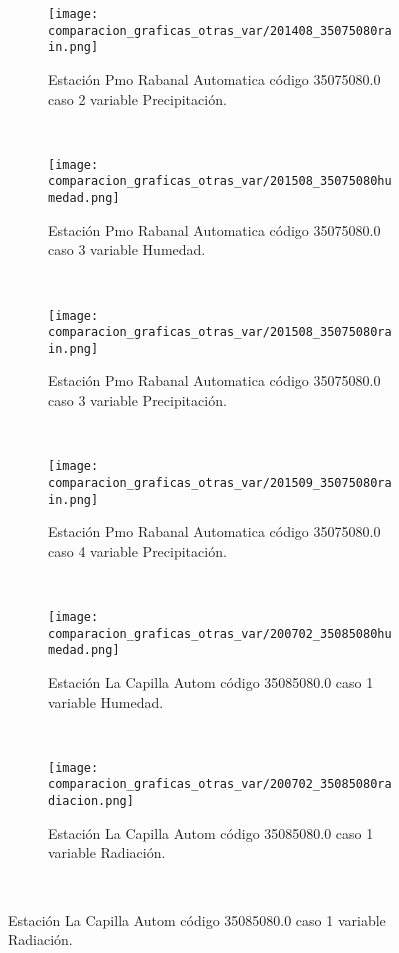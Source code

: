 \begin{figure}[H]
\centering
\begin{subfigure}[normla]{0.4\textwidth}
\caption{Estación Pmo Rabanal Automatica  código 35075080.0 caso 2 variable Precipitación.}
\texttt{[image: comparacion\_graficas\_otras\_var/201408\_35075080rain.png]}
\end{subfigure}
~
\begin{subfigure}[normla]{0.4\textwidth}
\caption{Estación Pmo Rabanal Automatica  código 35075080.0 caso 3 variable Humedad.}
\texttt{[image: comparacion\_graficas\_otras\_var/201508\_35075080humedad.png]}
\end{subfigure}
~
\begin{subfigure}[normla]{0.4\textwidth}
\caption{Estación Pmo Rabanal Automatica  código 35075080.0 caso 3 variable Precipitación.}
\texttt{[image: comparacion\_graficas\_otras\_var/201508\_35075080rain.png]}
\end{subfigure}
~
\begin{subfigure}[normla]{0.4\textwidth}
\caption{Estación Pmo Rabanal Automatica  código 35075080.0 caso 4 variable Precipitación.}
\texttt{[image: comparacion\_graficas\_otras\_var/201509\_35075080rain.png]}
\end{subfigure}
~
\begin{subfigure}[normla]{0.4\textwidth}
\caption{Estación La Capilla Autom código 35085080.0 caso 1 variable Humedad.}
\texttt{[image: comparacion\_graficas\_otras\_var/200702\_35085080humedad.png]}
\end{subfigure}
~
\begin{subfigure}[normla]{0.4\textwidth}
\caption{Estación La Capilla Autom código 35085080.0 caso 1 variable Radiación.}
\texttt{[image: comparacion\_graficas\_otras\_var/200702\_35085080radiacion.png]}
\end{subfigure}
~
\end{figure}
           
